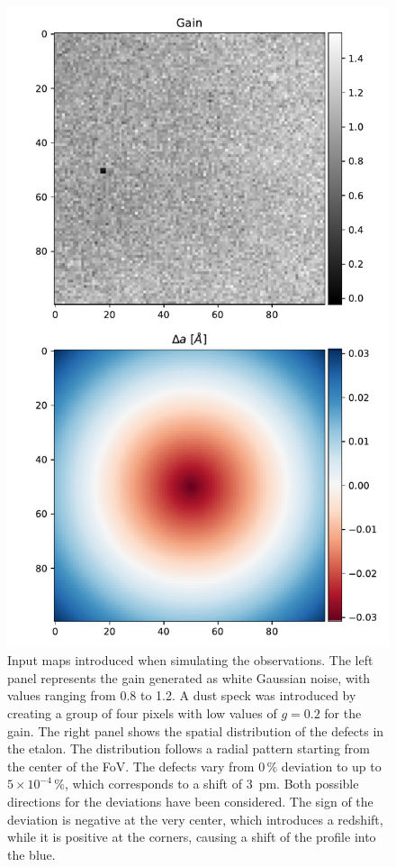 \begin{figure}
  \centering
    \includegraphics[width=\textwidth]{figures/EtalonPaper/Gain_Da_Inputs.pdf}
    \caption{
      Input maps introduced when simulating the observations. The left panel represents the gain generated as white Gaussian noise, with values ranging from 0.8 to 1.2. A dust speck was introduced by creating a group of four pixels with low values of $g=0.2$ for the gain. The right panel shows the spatial distribution of the defects in the etalon. The distribution follows a radial pattern starting from the center of the FoV. The defects vary from $0\,\%$ deviation to up to $5\times 10 ^{-4}\,\%$, which corresponds to a shift of 3~pm. Both possible directions for the deviations have been considered. The sign of the deviation is negative at the very center, which introduces a redshift, while it is positive at the corners, causing a shift of the profile into the blue.
      \label{fig_etalon_corr: Inputs}}
\end{figure}


